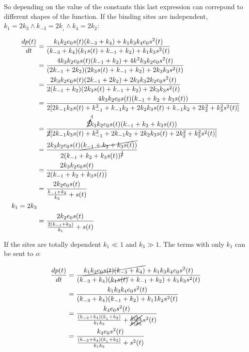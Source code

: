     So depending on the value of the constants this last expression can correpond to different shapes of the function.
    If the binding sites are independent, $k_1 = 2k_3\land k_{-3} = 2k_{_1}\land k_4 = 2k_2$:

    \begin{align*}
      \frac{dp(t)}{dt} &= \frac{k_1k_2e_0s(t)(k_{-3}+k_4) + k_1k_3k_4e_0s^2(t)}{(k_{-3}+k_4)(k_1s(t) + k_{-1} + k_2)+ k_1k_3s^2(t)}\\
                       &= \frac{4k_3k_2e_0s(t)(k_{-1}+k_2) + 4k^2k_3k_2e_0s^2(t)}{(2k_{-1}+2k_2)(2k_3s(t) + k_{-1} + k_2)+ 2k_3k_3s^2(t)}\\
                       &= \frac{2k_3k_2e_0s(t)(2k_{-1}+2k_2) + 2k_3k_32k_2e_0s^2(t)}{2(k_{-1}+k_2)(2k_3s(t) + k_{-1} + k_2)+ 2k_3k_3s^2(t)}\\
                       &= \frac{4k_3k_2e_0s(t)(k_{-1} + k_2 + k_3s(t))}{2[2k_{-1}k_3s(t) + k_{-1}^2 + k_{-1}k_2 + 2k_{2}k_3s(t) + k_{-1}k_2 + 2k^2_2 + k^2_3s^2(t)]}\\
                       &= \frac{\cancelto{4}{2}k_3k_2e_0s(t)(k_{-1} + k_2 + k_3s(t))}{\cancel{2}[2k_{-1}k_3s(t) + k_{-1}^2 + 2k_{-1}k_2 + 2k_{2}k_3s(t) + 2k^2_2 + k^2_3s^2(t)]}\\
                       &= \frac{2k_3k_2e_0s(t)\cancel{(k_{-1} + k_2 + k_3s(t))}}{2(k_{-1} + k_2 + k_3s(t))^{\cancel{2}}}\\
                       &= \frac{2k_3k_2e_0s(t)}{2(k_{-1} + k_2 + k_3s(t))}\\
                       &= \frac{2k_2e_0s(t)}{\frac{k_{-1}+k_2}{k_3} + s(t)}\\
            k_1 = 2k_3 &\\
                       &= \frac{2k_2e_0s(t)}{\frac{2(k_{-1}+k_2)}{k_1} + s(t)}\\

    \end{align*}

    If the sites are totally dependent $k_1\ll 1$ and $k_3\gg 1$.
    The terms with only $k_1$ can be sent to $o$:

    \begin{align*}
      \frac{dp(t)}{dt} &= \frac{\cancel{k_1k_2e_0s(t)(k_{-3}+k_4)} + k_1k_3k_4e_0s^2(t)}{(k_{-3}+k_4)(\cancel{k_1s(t)} + k_{-1} + k_2)+ k_1k_3s^2(t)}\\
                       &= \frac{k_1k_3k_4e_0s^2(t)}{(k_{-3}+k_4)(k_{-1}+k_2) + k_11k_2s^2(t)}\\
                       &= \frac{k_4e_0s^{2}(t)}{\frac{(k_{-3}+k_4)(k_{_1}+k_2)}{k_1k_3} + \frac{\cancel{k_1}\cancel{k_3}}{\cancel{k_1}\cancel{k_3}}s^2(t)}\\
                       &= \frac{k_4e_0s^{2}(t)}{\frac{(k_{-3}+k_4)(k_{_1}+k_2)}{k_1k_3} + s^2(t)}\\
    \end{align*}

